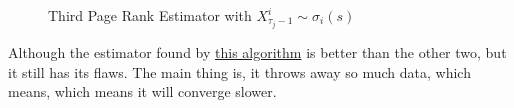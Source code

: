 \begin{figure}[H]
	\centering
	\caption{Third Page Rank Estimator with \(X^i_{\tau_j - 1}\sim\sigma_i(s)\)}
	\label{fig:Monte-Carlo-Estimator-3}
\end{figure}

\begin{problem}
Although the estimator found by \hyperref[algo:Monte-Carlo-algorithm-3]{this algorithm} is better than the other two, but it still has its flaws.  The main thing is, it throws away so much data, which means, which means it will converge slower.
\end{problem}